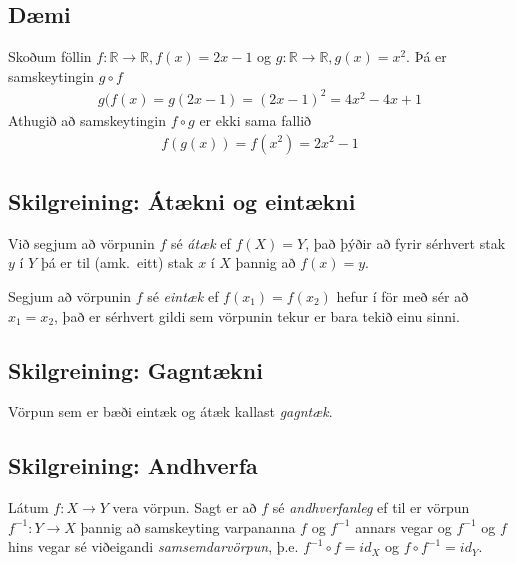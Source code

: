 \documentclass[a4paper,10pt,icelandic]{sphinxmanual}
\begin{document}


\subsection{Dæmi}
\label{kafli01:daemi}
Skoðum föllin \(f:\mathbb R \to \mathbb R, f(x) = 2x-1\)
og \(g:\mathbb R \to \mathbb R, g(x) = x^2\).
Þá er samskeytingin \(g\circ f\)
\begin{equation*}
\begin{split}g(f(x) = g(2x -1) = (2x-1)^2 = 4x^2-4x+1\end{split}
\end{equation*}
Athugið að samskeytingin \(f \circ g\) er ekki sama fallið
\begin{equation*}
\begin{split}f(g(x)) = f(x^2) = 2x^2-1\end{split}
\end{equation*}

\subsection{Skilgreining: Átækni og eintækni}
\label{kafli01:skilgreining-ataekni-og-eintaekni}\label{kafli01:index-6}
Við segjum að vörpunin \(f\) sé \textit{átæk} ef
\(f(X)=Y\), það þýðir að fyrir sérhvert stak \(y\) í \(Y\)
þá er til (amk. eitt) stak \(x\) í \(X\) þannig að
\(f(x)=y\).

Segjum að vörpunin \(f\) sé \textit{eintæk} ef \(f(x_1) = f(x_2)\)
hefur í för með sér að \(x_1=x_2\), það er sérhvert gildi sem vörpunin
tekur er bara tekið einu sinni.


\subsection{Skilgreining: Gagntækni}
\label{kafli01:skilgreining-gagntaekni}\label{kafli01:index-7}
Vörpun sem er bæði eintæk og átæk kallast \textit{gagntæk}.


\subsection{Skilgreining: Andhverfa}
\label{kafli01:skilgreining-andhverfa}\label{kafli01:index-8}\label{kafli01:andhverfa}
Látum \(f:X \to Y\) vera vörpun. Sagt er að \(f\)
sé \textit{andhverfanleg} ef til er vörpun \(f^{-1}:Y \to X\) þannig að
samskeyting varpananna \(f\) og \(f^{-1}\) annars vegar og
\(f^{-1}\) og \(f\) hins vegar sé viðeigandi \textit{samsemdarvörpun},
þ.e. \(f^{-1}\circ f=id_X\) og \(f\circ f^{-1} = id_Y\).
\end{document}
